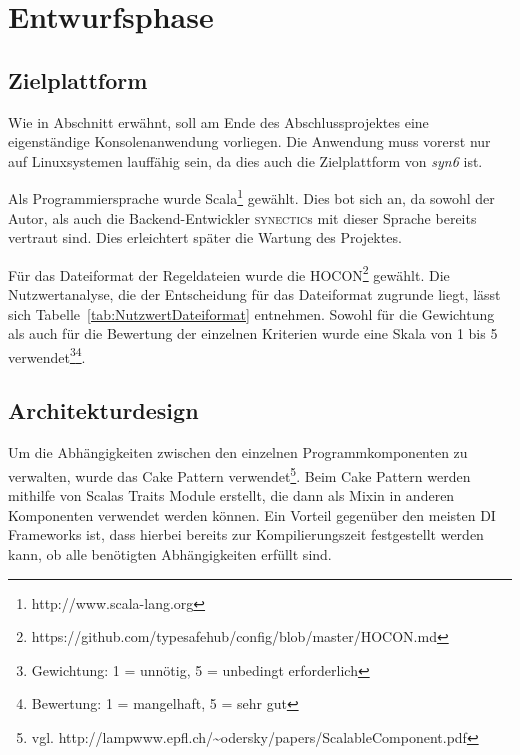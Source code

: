 \section{Entwurfsphase} 
\label{sec:Entwurfsphase}

\subsection{Zielplattform}
\label{sec:Zielplattform}

Wie in Abschnitt  erwähnt, soll am Ende des Abschlussprojektes eine eigenständige Konsolenanwendung vorliegen. Die Anwendung muss vorerst nur auf Linuxsystemen lauffähig sein, da dies auch die Zielplattform von \textit{syn6} ist.

Als Programmiersprache wurde Scala\footnote{http://www.scala-lang.org} gewählt. Dies bot sich an, da sowohl der Autor, als auch die Backend-Entwickler \textsc{synectic}s mit dieser Sprache bereits vertraut sind. Dies erleichtert später die Wartung des Projektes.

Für das Dateiformat der Regeldateien wurde die \ac{HOCON}\footnote{https://github.com/typesafehub/config/blob/master/HOCON.md} gewählt. Die Nutzwertanalyse, die der Entscheidung für das Dateiformat zugrunde liegt, lässt sich Tabelle~\ref{tab:NutzwertDateiformat} entnehmen. Sowohl für die Gewichtung als auch für die Bewertung der einzelnen Kriterien wurde eine Skala von 1 bis 5 verwendet\footnote{Gewichtung: 1 = unnötig, 5 = unbedingt erforderlich}\footnote{Bewertung: 1 = mangelhaft, 5 = sehr gut}.



\subsection{Architekturdesign}
\label{sec:Architekturdesign}

Um die Abhängigkeiten zwischen den einzelnen Programmkomponenten zu verwalten, wurde das Cake Pattern verwendet\footnote{vgl. http://lampwww.epfl.ch/\textasciitilde odersky/papers/ScalableComponent.pdf}. Beim Cake Pattern werden mithilfe von Scalas Traits Module erstellt, die dann als Mixin in anderen Komponenten verwendet werden können. Ein Vorteil gegenüber den meisten \ac{DI} Frameworks ist, dass hierbei bereits zur Kompilierungszeit festgestellt werden kann, ob alle benötigten Abhängigkeiten erfüllt sind.

